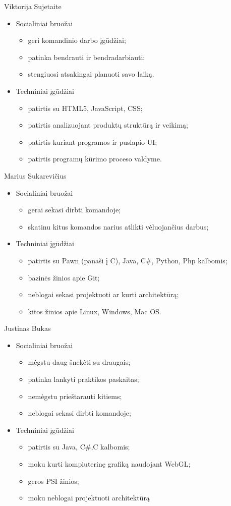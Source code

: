 \documentclass[11pt]{article}
\begin{document}
	Viktorija Sujetaite
	\begin{itemize}
		\item Socialiniai bruožai
		\begin{itemize}
			\item geri komandinio darbo įgūdžiai;
			\item patinka bendrauti ir bendradarbiauti;
			\item stengiuosi atsakingai planuoti savo laiką.
		\end{itemize}
		\item Techniniai įgūdžiai
		\begin{itemize}
			\item patirtis su HTML5, JavaScript, CSS;
			\item patirtis analizuojant produktų struktūrą ir veikimą;
			\item patirtis kuriant programos ir puslapio UI;
			\item patirtis programų kūrimo proceso valdyme.
		\end{itemize}
	\end{itemize}
	Marius Sukarevičius
	\begin{itemize}
		\item Socialiniai bruožai
		\begin{itemize}
			\item gerai sekasi dirbti komandoje;
			\item skatinu kitus komandos narius atlikti vėluojančius darbus;
		\end{itemize}
		\item Techniniai įgūdžiai
		\begin{itemize}
			\item patirtis su Pawn (panaši į C), Java, C\#, Python, Php kalbomis;
			\item bazinės žinios apie Git;
			\item neblogai sekasi projektuoti ar kurti architektūrą;
			\item kitos žinios apie Linux, Windows, Mac OS.
		\end{itemize}
	\end{itemize}
	Justinas Bukas
	\begin{itemize}
		\item Socialiniai bruožai
		\begin{itemize}
			\item mėgstu daug šnekėti su draugais;
			\item patinka lankyti praktikos paskaitas;
			\item nemėgstu prieštarauti kitiems;
			\item neblogai sekasi dirbti komandoje;
		\end{itemize}
		\item Techniniai įgūdžiai
		\begin{itemize}
			\item patirtis su Java, C\#,C kalbomis;
			\item moku kurti kompiuterinę grafiką naudojant WebGL;
			\item geros PSI žinios;
			\item moku neblogai projektuoti architektūrą			
		\end{itemize}
	\end{itemize}
\end{document}
